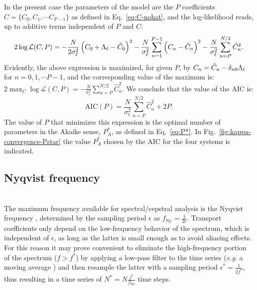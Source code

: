 In the present case the parameters of the model are the $P$ coefficients $C=\{C_{0},C_{1},\cdots C_{P-1}\}$ as defined in Eq.~\eqref{eq:C-nohat}, and the log-likelihood reads, up to additive terms independent of $P$ and $C$:
\begin{equation}
    2\log\mathcal{L}(C,P) = -\frac{N}{2\sigma_\ell^{2}}\left(C_{0}+{\mathrm\Lambda}_{\ell}-\hat{C}_{0}\right)^{2} -\frac{N}{\sigma_\ell^{2}}\sum_{n=1}^{P-1}\left(C_{n}-\hat{C}_{n}\right)^{2} -\frac{N}{\sigma_\ell^{2}}\sum_{n=P}^{N/2} \hat{C}_{n}^{2} .
\end{equation}
Evidently, the above expression is maximized, for given $P$, by $C_{n} = \hat{C}_{n} - \delta_{n0}{\mathrm\Lambda}_{\ell}$ for $n=0,1,\cdots P-1$, and the corresponding value of the maximum is: $2\max_C\log\mathcal{L}(C,P) = -\frac{N}{\sigma_\ell^{2}} \sum_{n=P}^{N/2} \hat{C}_{n}^{2}$.
We conclude that the value of the AIC is:
\begin{equation}
    \mathrm{AIC}(P) = \frac{N}{\sigma_\ell^{2}} \sum_{n=P}^{N/2} \hat{C}_{n}^{2} + 2P . \label{eq:AIC-P}
\end{equation}
The value of $P$ that minimizes this expression is the optimal number of parameters in the Akaike sense, $P_A^*$, as defined in Eq.~\eqref{eq:P*}.
In Fig.~\ref{fig:kappa-convergence-Pstar} the value $P_A^*$ chosen by the AIC for the four systems is indicated.


\subsection{Nyqvist frequency}  \label{sec:cepstral-nyqvist}
\\
The maximum frequency available for spectral/cepstral analysis is the Nyqvist frequency \cite{Oppenheim1999}, determined by the sampling period $\epsilon$ as $f_{\mathrm{Ny}}=\frac{1}{2\epsilon}$. Transport coefficients only depend on the low-frequency behavior of the spectrum, which is independent of $\epsilon$, as long as the latter is small enough as to avoid aliasing effects. For this reason it may prove convenient to eliminate the high-frequency portion of the spectrum ($f>f^*$) by applying a low-pass filter to the time series (\emph{e.g.} a moving average \cite{MovingAverage}) and then resample the latter with a sampling period $\epsilon^*=\frac{1}{2f^*}$, thus resulting in a time series of $N^*=N\frac{f^*}{f_{\mathrm{Ny}}}$ time steps.

